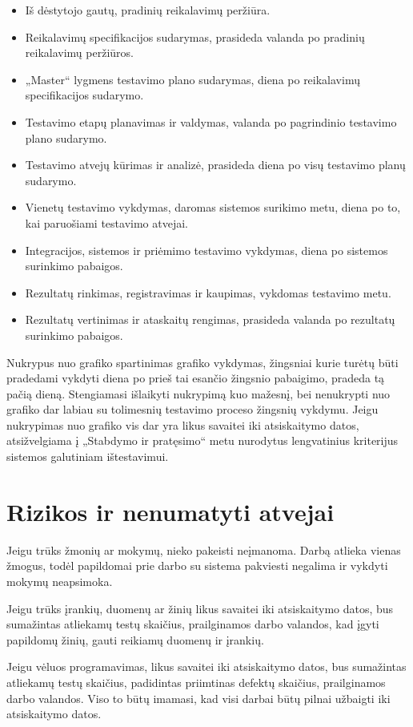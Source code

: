 \begin{itemize}
	\item Iš dėstytojo gautų, pradinių reikalavimų peržiūra.
	\item Reikalavimų specifikacijos sudarymas, prasideda valanda po pradinių reikalavimų peržiūros.
	\item „Master“ lygmens testavimo plano sudarymas, diena po reikalavimų specifikacijos sudarymo.
	\item Testavimo etapų planavimas ir valdymas, valanda po pagrindinio testavimo plano sudarymo.
	\item Testavimo atvejų kūrimas ir analizė, prasideda diena po visų testavimo planų sudarymo.
	\item Vienetų testavimo vykdymas, daromas sistemos surikimo metu, diena po to, kai paruošiami testavimo atvejai.
	\item Integracijos, sistemos ir priėmimo testavimo vykdymas, diena po sistemos surinkimo pabaigos.
	\item Rezultatų rinkimas, registravimas ir kaupimas, vykdomas testavimo metu.
	\item Rezultatų vertinimas ir ataskaitų rengimas, prasideda valanda po rezultatų surinkimo pabaigos.
\end{itemize}

Nukrypus nuo grafiko spartinimas grafiko vykdymas, žingsniai kurie turėtų būti pradedami vykdyti diena po prieš tai esančio žingsnio pabaigimo, pradeda tą pačią dieną. 
Stengiamasi išlaikyti nukrypimą kuo mažesnį, bei nenukrypti nuo grafiko dar labiau su tolimesnių testavimo proceso žingsnių vykdymu. 
Jeigu nukrypimas  nuo grafiko vis dar yra likus savaitei iki atsiskaitymo datos, atsižvelgiama į „Stabdymo ir pratęsimo“ metu nurodytus lengvatinius kriterijus sistemos galutiniam ištestavimui.

\section{Rizikos ir nenumatyti atvejai}

Jeigu trūks žmonių ar mokymų, nieko pakeisti neįmanoma. Darbą atlieka vienas žmogus, todėl papildomai prie darbo su sistema pakviesti negalima ir vykdyti mokymų neapsimoka. 

Jeigu trūks įrankių, duomenų ar žinių likus savaitei iki atsiskaitymo datos, bus sumažintas atliekamų testų skaičius, prailginamos darbo valandos, kad įgyti papildomų žinių, gauti reikiamų duomenų ir įrankių.

Jeigu vėluos programavimas, likus savaitei iki atsiskaitymo datos, bus sumažintas atliekamų testų skaičius, padidintas priimtinas defektų skaičius, prailginamos darbo valandos. Viso to būtų imamasi, kad visi darbai būtų pilnai užbaigti iki atsiskaitymo datos.

